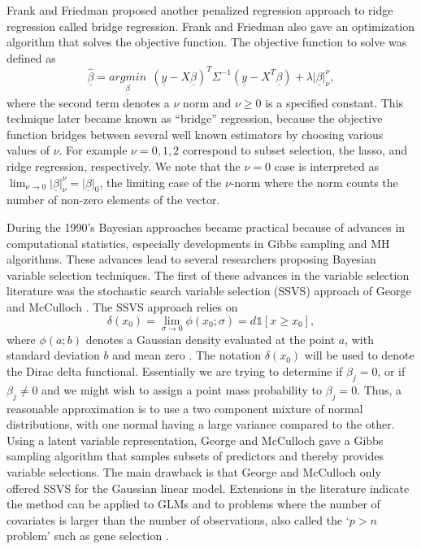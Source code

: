  Frank and Friedman \cite{lldiko1993statistical} proposed another penalized regression approach to ridge regression called bridge regression. Frank and Friedman also gave an optimization algorithm that solves the objective function. 
 The objective function to solve was defined as
 \begin{equation}
\hat{\underline{\beta}}= \underset{\underline{\beta}}{argmin}\ \ (\underline{y} -X\underline{\beta})^T\Sigma^{-1}(\underline{y} -X^T\underline{\beta}) + \lambda\vert\underline{\beta}\vert_{\nu}^{\nu},
  \end{equation}  
where the second term denotes a $\nu$ norm  and $\nu \geq 0$ is a specified constant. This technique later became known as ``bridge'' regression, because the objective function bridges between several well known estimators by choosing various values of $\nu$. For example $\nu = 0,1,2$ correspond to subset selection, the lasso, and ridge regression, respectively. We note that the $\nu=0$ case is interpreted as $\lim_{\nu\to0}\vert\underline{\beta}\vert_{\nu}^{\nu} = \vert\underline{\beta}\vert_0$, the limiting case of the $\nu$-norm where the norm counts the number of non-zero elements of the vector. 
 
 During the 1990's Bayesian approaches became practical because of advances in computational statistics, especially developments in Gibbs sampling and MH algorithms. These advances lead to several researchers proposing Bayesian variable selection techniques. The first of these advances in the variable selection literature was the stochastic search variable selection (SSVS) approach of George and McCulloch \cite{george1993variable}.  The SSVS approach relies on  
 \begin{equation}
  \delta(x_0) = \lim_{\sigma\to 0}\phi(x_0;\sigma) = d\mathds{1}[x\geq x_0],
 \end{equation}
where $\phi(a;b)$ denotes a Gaussian density evaluated at the point $a$, with standard deviation $b$ and mean zero \cite{geweke1996variable,mitchell1988bayesian}. The notation $ \delta(x_0)$ will be used to denote the Dirac delta functional. Essentially we are trying to determine if $\beta_j=0$, or if $\beta_j\neq0$ and we might wish to assign a point mass probability to $\beta_j=0$. Thus, a reasonable approximation is to use a two component mixture of normal distributions, with one normal having a large variance compared to the other. Using a latent variable representation, George and McCulloch gave a Gibbs sampling algorithm that samples subsets of predictors and thereby provides variable selections.  The main drawback is that George and McCulloch only offered SSVS for the Gaussian linear model. Extensions in the literature indicate the method can be applied to GLMs and to problems where the number of covariates is larger than the number of observations, also called the `$p>n$ problem' such as gene selection \cite{yi2003stochastic,george2000variable}.  
     
